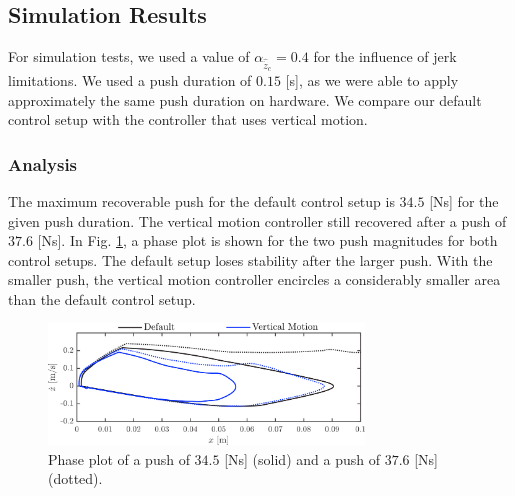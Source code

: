 \documentclass[letterpaper, 10 pt, conference]{ieeeconf}  %
\begin{document}
\subsection{Simulation Results}
For simulation tests, we used a value of $\alpha_{\hat{\ddot{z}}_{c}}=0.4$ for the influence of jerk limitations. We used a push duration of $0.15$ [s], as we were able to apply approximately the same push duration on hardware. We compare our default control setup with the controller that uses vertical motion. 

\subsubsection{Analysis}
The maximum recoverable push for the default control setup is $34.5$ [Ns] for the given push duration. The vertical motion controller still recovered after a push of $37.6$ [Ns]. In Fig. \ref{fig:valcomparephase}, a phase plot is shown for the two push magnitudes for both control setups. The default setup loses stability after the larger push. With the smaller push, the vertical motion controller encircles a considerably smaller area than the default control setup.
\begin{figure}
      \centering
      \includegraphics[width=3.3in]{valcomparephase.png}
      \caption{Phase plot of a push of $34.5$ [Ns] (solid) and a push of $37.6$ [Ns] (dotted).}
      \label{fig:valcomparephase}
\end{figure}
\end{document}
